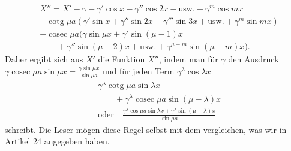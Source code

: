 \[
\begin{aligned}
&X''={}X'-\gamma-\gamma'\cos x-\gamma''\cos 2x-\text{usw.}-\gamma^{m}\cos mx\\[5pt]
&+\operatorname{cotg}\mu a(\gamma'\sin x+\gamma''\sin 2x+\gamma'''\sin 3x+\text{usw.}+\gamma^{m}\sin mx)\\[5pt]
&+\operatorname{cosec}\mu a(\gamma\sin\mu x+\gamma'\sin(\mu-1)x\\[5pt]
&\qquad{}+\gamma''\sin(\mu-2)x+\text{usw.}+\gamma^{\mu-m}\sin(\mu-m)x).
\end{aligned}
\]
Daher ergibt sich aus $X'$ die Funktion $X''$, indem man für $\gamma$ den Ausdruck $\gamma\operatorname{cosec}\mu a\sin\mu x=\frac{\gamma\sin\mu x}{\sin\mu a}$ und für jeden Term $\gamma^{\lambda}\cos\lambda x$
\[
\begin{aligned}
&\gamma^{\lambda}\operatorname{cotg}\mu a\sin\lambda x\\[5pt]
&\qquad{}+\gamma^{\lambda}\operatorname{cosec}\mu a\sin(\mu-\lambda)x
\\[5pt]
&\text{oder}\quad
\frac{\gamma^{\lambda}\cos\mu a\sin\lambda x+\gamma^{\lambda}\sin(\mu-\lambda)x}{\sin\mu a}
\end{aligned}
\]
schreibt. Die Leser mögen diese Regel selbst mit dem vergleichen, was wir in Artikel 24 angegeben haben.

\endgroup
